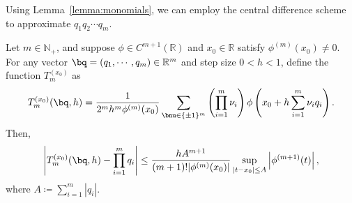 \documentclass[11pt]{article}
\begin{document}
Using Lemma~\ref{lemma:monomials}, we can employ the central difference scheme to approximate $q_1 q_2 \cdots q_m$. 
\begin{lemma}\label{lemma:Tm}
    Let $m \in \mathbb{N}_{+}$, 
    and suppose $\phi \in C^{m+1}(\mathbb{R})$ and $x_0 \in \mathbb{R}$
    satisfy $\phi^{(m)}(x_0) \neq 0$.
    For any vector $\bq = (q_1, \cdots, q_m) \in \mathbb{R}^m$ and  step size $0<h<1$, define the function $T_{m}^{(x_0)}$ as
    \begin{equation*}
        T_{m}^{(x_0)}(\bq, h) = \frac{1}{2^m h^m \phi^{(m)}(x_0)} \sum_{\bnu \in \{ \pm 1\}^m} \left( \prod_{i=1}^m \nu_i \right) \phi \left(x_0 + h \sum_{i=1}^m \nu_i q_i\right).
    \end{equation*}
    Then,
    \begin{equation*}
        \left|T_{m}^{(x_0)}(\bq, h) - \prod_{i=1}^m q_i \right| \leq \frac{h A^{m+1}}{ (m+1)!|\phi^{(m)}(x_0)|} \sup_{|t-x_0| \leq A} \left| \phi^{(m+1)}(t)\right|,
    \end{equation*}
    where $A\coloneqq \sum_{i=1}^m |q_i|$. 
\end{lemma}
\end{document}
